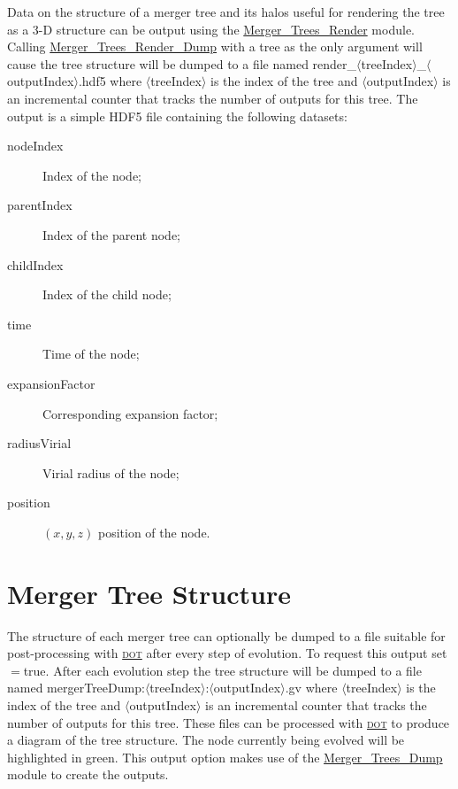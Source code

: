 Data on the structure of a merger tree and its halos useful for rendering the tree as a 3-D structure can be output using the \hyperlink{merger_trees.render.F90:merger_trees_render}{\normalfont \ttfamily Merger\_Trees\_Render} module. Calling \hyperlink{merger_trees.render.F90:merger_trees_render:merger_trees_render_dump}{\normalfont \ttfamily Merger\_Trees\_Render\_Dump} with a tree as the only argument will cause the tree structure will be dumped to a file named {\normalfont \ttfamily render\_$\langle$treeIndex$\rangle$\_$\langle$outputIndex$\rangle$.hdf5} where $\langle${\normalfont \ttfamily treeIndex}$\rangle$ is the index of the tree and $\langle${\normalfont \ttfamily outputIndex}$\rangle$ is an incremental counter that tracks the number of outputs for this tree. The output is a simple HDF5 file containing the following datasets:
\begin{description}
 \item [{\normalfont \ttfamily nodeIndex}] Index of the node;
 \item [{\normalfont \ttfamily parentIndex}] Index of the parent node;
 \item [{\normalfont \ttfamily childIndex}] Index of the child node;
 \item [{\normalfont \ttfamily time}] Time of the node;
 \item [{\normalfont \ttfamily expansionFactor}] Corresponding expansion factor;
 \item [{\normalfont \ttfamily radiusVirial}] Virial radius of the node;
 \item [{\normalfont \ttfamily position}] $(x,y,z)$ position of the node.
\end{description}

\section{Merger Tree Structure}

The structure of each merger tree can optionally be dumped to a file suitable for post-processing with \href{http://www.graphviz.org/}{\normalfont \scshape dot} after every step of evolution. To request this output set {\normalfont \ttfamily [mergerTreesDumpStructure]}$=${\normalfont \ttfamily true}. After each evolution step the tree structure will be dumped to a file named {\normalfont \ttfamily mergerTreeDump:$\langle$treeIndex$\rangle$:$\langle$outputIndex$\rangle$.gv} where $\langle${\normalfont \ttfamily treeIndex}$\rangle$ is the index of the tree and $\langle${\normalfont \ttfamily outputIndex}$\rangle$ is an incremental counter that tracks the number of outputs for this tree. These files can be processed with \href{http://www.graphviz.org/}{\normalfont \scshape dot} to produce a diagram of the tree structure. The node currently being evolved will be highlighted in green. This output option makes use of the \hyperlink{objects.merger_trees.dump.F90:merger_trees_dump}{\normalfont \ttfamily Merger\_Trees\_Dump} module to create the outputs.

